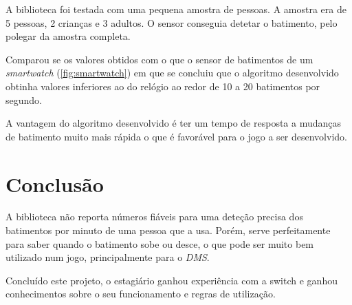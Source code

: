 A biblioteca foi testada com uma pequena amostra de pessoas.
A amostra era de 5 pessoas, 2 crianças e 3 adultos. O sensor conseguia detetar o batimento, pelo polegar da amostra completa.

Comparou se os valores obtidos com o que o sensor de batimentos de um \textit{smartwatch} (\cref{fig:smartwatch}) em que se concluiu que o algoritmo desenvolvido obtinha valores inferiores ao do relógio ao redor de 10 a 20 batimentos por segundo.

A vantagem do algoritmo desenvolvido é ter um tempo de resposta a mudanças de batimento muito mais rápida o que é favorável para o jogo a ser desenvolvido.

\section{Conclusão}

A biblioteca não reporta números fiáveis para uma
deteção precisa dos batimentos por minuto de uma pessoa que a usa. Porém, serve perfeitamente para saber quando o batimento sobe ou desce, o que pode ser muito bem utilizado num jogo, principalmente para o \textit{DMS}.

Concluído este projeto, o estagiário ganhou experiência com a \gls{switch} e ganhou conhecimentos sobre o seu funcionamento e regras de utilização.

